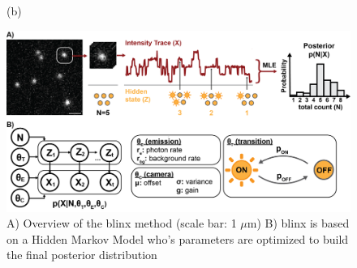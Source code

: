 \begin{figure}

  \begin{panel}{(b)}{\textwidth}
    \vspace{4mm}
  \end{panel}
\end{figure}

\begin{figure}
  \includegraphics[width=\linewidth]{figures/placeholders/figure_1_overview.png}
  \caption{A) Overview of the blinx method (scale bar: 1 $\mu$m) B) blinx is based on a Hidden Markov Model who's parameters are optimized to build the final posterior
  distribution}
  \label{fig:method:overview}
\end{figure}
